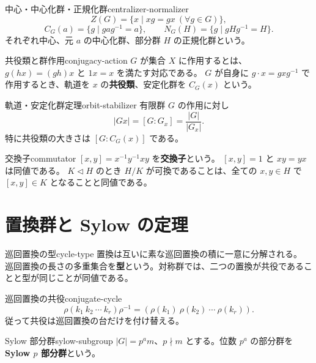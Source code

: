 \begin{definition}{中心・中心化群・正規化群}{centralizer-normalizer}
\[
 Z(G)=\{x\mid xg=gx\ (\forall g\in G)\},
\]
\[
 C_G(a)=\{g\mid gag^{-1}=a\},\qquad
 N_G(H)=\{g\mid gHg^{-1}=H\}.
\]
それぞれ中心、元 $a$ の中心化群、部分群 $H$ の正規化群という。
\end{definition}

\begin{definition}{共役類と群作用}{conjugacy-action}
$G$ が集合 $X$ に作用するとは、$g(hx)=(gh)x$ と $1x=x$ を満たす対応である。
$G$ が自身に $g\cdot x=gxg^{-1}$ で作用するとき、軌道を $x$ の\textbf{共役類}、安定化群を $C_G(x)$ という。
\end{definition}

\begin{theorem}{軌道・安定化群定理}{orbit-stabilizer}
有限群 $G$ の作用に対し
\[
 |Gx|=[G:G_x]=\frac{|G|}{|G_x|}.
\]
特に共役類の大きさは $[G:C_G(x)]$ である。
\end{theorem}

\begin{definition}{交換子}{commutator}
$[x,y]=x^{-1}y^{-1}xy$ を\textbf{交換子}という。
$[x,y]=1$ と $xy=yx$ は同値である。
$K\triangleleft H$ のとき $H/K$ が可換であることは、全ての $x,y\in H$ で $[x,y]\in K$ となることと同値である。
\end{definition}

\section{置換群と Sylow の定理}

\begin{definition}{巡回置換の型}{cycle-type}
置換は互いに素な巡回置換の積に一意に分解される。
巡回置換の長さの多重集合を\textbf{型}という。対称群では、二つの置換が共役であることと型が同じことが同値である。
\end{definition}

\begin{proposition}{巡回置換の共役}{conjugate-cycle}
\[
 \rho(k_1\ k_2\ \cdots\ k_r)\rho^{-1}
 =(\rho(k_1)\ \rho(k_2)\ \cdots\ \rho(k_r)).
\]
従って共役は巡回置換の台だけを付け替える。
\end{proposition}

\begin{definition}{Sylow 部分群}{sylow-subgroup}
$|G|=p^am$、$p\nmid m$ とする。位数 $p^a$ の部分群を\textbf{Sylow $p$ 部分群}という。
\end{definition}

